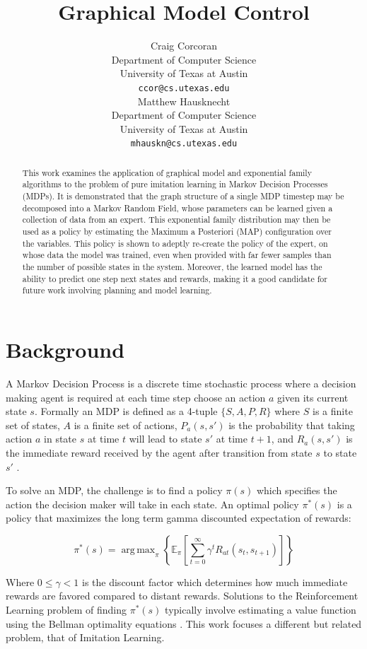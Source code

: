 \documentclass{article} %
\title{Graphical Model Control}
\author{
Craig Corcoran\\
Department of Computer Science\\
University of Texas at Austin\\
\texttt{ccor@cs.utexas.edu} \\
\And
Matthew Hausknecht\\
Department of Computer Science\\
University of Texas at Austin\\
\texttt{mhauskn@cs.utexas.edu} \\
}
\DeclareMathOperator*{\argmax}{arg\,max}
\begin{document}
\maketitle

\begin{abstract}
This work examines the application of graphical model and exponential family algorithms to the problem of pure imitation learning in Markov Decision Processes (MDPs). It is demonstrated that the graph structure of a single MDP timestep may be decomposed into a Markov Random Field, whose parameters can be learned given a collection of data from an expert. This exponential family distribution may then be used as a policy by estimating the Maximum a Posteriori (MAP) configuration over the variables. This policy is shown to adeptly re-create the policy of the expert, on whose data the model was trained, even when provided with far fewer samples than the number of possible states in the system. Moreover, the learned model has the ability to predict one step next states and rewards, making it a good candidate for future work involving planning and model learning.
\end{abstract}

\section{Background}
A Markov Decision Process is a discrete time stochastic process where a decision making agent is required at each time step choose an action $a$ given its current state $s$. Formally an MDP is defined as a 4-tuple $\{S,A,P,R\}$ where $S$ is a finite set of states, $A$ is a finite set of actions, $P_a(s,s')$ is the probability that taking action $a$ in state $s$ at time $t$ will lead to state $s'$ at time $t+1$, and $R_a(s,s')$ is the immediate reward received by the agent after transition from state $s$ to state $s'$ \cite{bellman57}.

To solve an MDP, the challenge is to find a policy $\pi(s)$ which specifies the action the decision maker will take in each state. An optimal policy $\pi^*(s)$ is a policy that maximizes the long term gamma discounted expectation of rewards:

\begin{equation}
\label{eqn:opt-policy}
\pi^*(s) = \argmax_\pi \left\{\mathbb{E}_\pi\left[\sum_{t=0}^{\infty} \gamma^tR_{at}(s_t,s_{t+1})\right] \right\}
\end{equation}

Where $0 \le \gamma < 1$ is the discount factor which determines how much immediate rewards are favored compared to distant rewards. Solutions to the Reinforcement Learning problem of finding $\pi^*(s)$ typically involve estimating a value function using the Bellman optimality equations \cite{sutton98}. This work focuses a different but related problem, that of Imitation Learning.
\end{document}
